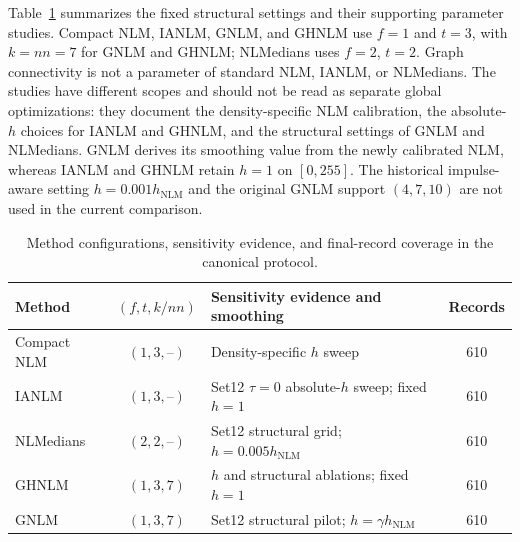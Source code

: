 \documentclass[pdflatex,iicol,sn-mathphys-num]{sn-jnl}
\newif\ifshowportuguese
\newcommand{\pt}[1]{\ifshowportuguese\par\begingroup\small\color{blue!55!black}\noindent\textbf{PT: }#1\par\endgroup\fi}
\begin{document}
Table~\ref{tab:method_parameters} summarizes the fixed structural settings and their supporting parameter studies. Compact NLM, IANLM, GNLM, and GHNLM use $f=1$ and $t=3$, with $k=nn=7$ for GNLM and GHNLM; NLMedians uses $f=2$, $t=2$. Graph connectivity is not a parameter of standard NLM, IANLM, or NLMedians. The studies have different scopes and should not be read as separate global optimizations: they document the density-specific NLM calibration, the absolute-$h$ choices for IANLM and GHNLM, and the structural settings of GNLM and NLMedians. GNLM derives its smoothing value from the newly calibrated NLM, whereas IANLM and GHNLM retain $h=1$ on $[0,255]$. The historical impulse-aware setting $h=0.001h_{\mathrm{NLM}}$ and the original GNLM support $(4,7,10)$ are not used in the current comparison.
\pt{A Tabela~\ref{tab:method_parameters} resume as configurações estruturais fixas e os estudos de parâmetros que as sustentam. NLM compacto, IANLM, GNLM e GHNLM usam $f=1$ e $t=3$, com $k=nn=7$ para GNLM e GHNLM; o NLMedians usa $f=2$, $t=2$. A conectividade do grafo não é um parâmetro do NLM padrão, IANLM ou NLMedians. Os estudos têm escopos distintos e não devem ser interpretados como otimizações globais separadas: eles documentam a calibração NLM específica por densidade, as escolhas de $h$ absoluto para IANLM e GHNLM e as configurações estruturais de GNLM e NLMedians. O GNLM deriva seu parâmetro de suavização do NLM recém-calibrado, enquanto IANLM e GHNLM mantêm $h=1$ em $[0,255]$. A configuração histórica orientada a impulsos $h=0.001h_{\mathrm{NLM}}$ e o suporte original do GNLM $(4,7,10)$ não são usados na comparação atual.}

\begin{table}[!t]
\centering
\caption{Method configurations, sensitivity evidence, and final-record coverage in the canonical protocol.}
\label{tab:method_parameters}
\scriptsize
\setlength{\tabcolsep}{3pt}
\begin{tabular}{@{}l c p{} c@{}}
\toprule
Method & $(f,t,k/nn)$ & Sensitivity evidence and smoothing & Records \\
\midrule
Compact NLM & $(1,3,\text{--})$ & Density-specific $h$ sweep & 610 \\
IANLM & $(1,3,\text{--})$ & Set12 $\tau=0$ absolute-$h$ sweep; fixed $h=1$ & 610 \\
NLMedians & $(2,2,\text{--})$ & Set12 structural grid; $h=0.005h_{\mathrm{NLM}}$ & 610 \\
GHNLM & $(1,3,7)$ & $h$ and structural ablations; fixed $h=1$ & 610 \\
GNLM & $(1,3,7)$ & Set12 structural pilot; $h=\gamma h_{\mathrm{NLM}}$ & 610 \\
\bottomrule
\end{tabular}
\pt{Configurações dos métodos, evidência de sensibilidade e cobertura dos registros finais no protocolo canônico.}
\end{table}
\end{document}

